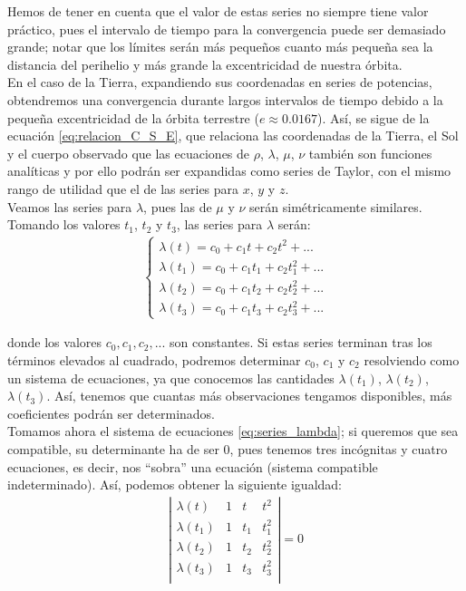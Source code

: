 \documentclass[11pt]{book}
\begin{document}
Hemos de tener en cuenta que el valor de estas series no siempre tiene valor práctico, pues el intervalo de tiempo para la convergencia puede ser demasiado grande; notar que los límites serán más pequeños cuanto más pequeña sea la distancia del perihelio y más grande la excentricidad de nuestra órbita.\\

En el caso de la Tierra, expandiendo sus coordenadas en series de potencias, obtendremos una convergencia durante largos intervalos de tiempo debido a la pequeña excentricidad de la órbita terrestre ($e\approx0.0167$). Así, se sigue de la ecuación \eqref{eq:relacion_C_S_E}, que relaciona las coordenadas de la Tierra, el Sol y el cuerpo observado que las ecuaciones de $\rho$, $\lambda$, $\mu$, $\nu$ también son funciones analíticas y por ello podrán ser expandidas como series de Taylor, con el mismo rango de utilidad que el de las series para $x$, $y$ y $z$.\\

Veamos las series para $\lambda$, pues las de $\mu$ y $\nu$ serán simétricamente similares. Tomando los valores $t_1$, $t_2$ y $t_3$, las series para $\lambda$ serán:
\begin{align}
\left\{
\begin{array}{l}
	\lambda(t)=c_0+c_1t+c_2t^2+...\\
	\lambda(t_1)=c_0+c_1t_1+c_2t_1^2+...\\
	\lambda(t_2)=c_0+c_1t_2+c_2t_2^2+...\\
	\lambda(t_3)=c_0+c_1t_3+c_2t_3^2+...
\end{array}
\right.
\label{eq:series_lambda}
\end{align}

\noindent donde los valores $c_0, c_1, c_2, ...$ son constantes. Si estas series terminan tras los términos elevados al cuadrado, podremos determinar $c_0$, $c_1$ y $c_2$ resolviendo como un sistema de ecuaciones, ya que conocemos las cantidades $\lambda(t_1)$, $\lambda(t_2)$, $\lambda(t_3)$. Así, tenemos que cuantas más observaciones tengamos disponibles, más coeficientes podrán ser determinados.\\

Tomamos ahora el sistema de ecuaciones \eqref{eq:series_lambda}; si queremos que sea compatible, su determinante ha de ser 0, pues tenemos tres incógnitas y cuatro ecuaciones, es decir, nos ``sobra'' una ecuación (sistema compatible indeterminado). Así, podemos obtener la siguiente igualdad:
\begin{align}
\left|
\begin{array}{cccc}
\lambda(t)   & 1 & t   & t^2  \\
\lambda(t_1) & 1 & t_1 & t^2_1\\
\lambda(t_2) & 1 & t_2 & t^2_2\\
\lambda(t_3) & 1 & t_3 & t^2_3\\
\end{array}
\right|
=0
\label{eq:resultante}
\end{align}
\end{document}
